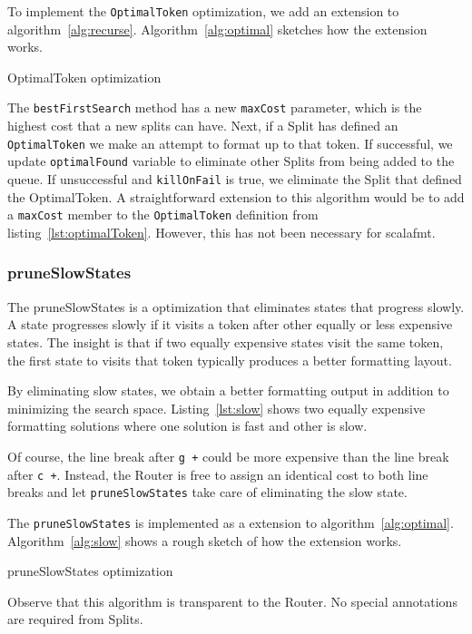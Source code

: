 To implement the \texttt{OptimalToken} optimization, we add an extension to algorithm~\ref{alg:recurse}.
Algorithm~\ref{alg:optimal} sketches how the extension works.
\begin{algorithm}
  \caption{OptimalToken optimization}\label{alg:optimal}
  
\end{algorithm}
The \texttt{bestFirstSearch} method has a new \texttt{maxCost} parameter, which is the highest cost that a new splits can have.
Next, if a Split has defined an \texttt{OptimalToken} we make an attempt to format up to that token.
If successful, we update \texttt{optimalFound} variable to eliminate other Splits from being added to the queue.
If unsuccessful and \texttt{killOnFail} is true, we eliminate the Split that defined the OptimalToken.
A straightforward extension to this algorithm would be to add a \texttt{maxCost} member to the \texttt{OptimalToken} definition from listing~\ref{lst:optimalToken}.
However, this has not been necessary for scalafmt.

\subsubsection{pruneSlowStates}
The pruneSlowStates is a optimization that eliminates states that progress slowly.
A state progresses slowly if it visits a token after other equally or less expensive states.
The insight is that if two equally expensive states visit the same token, the first state to visits that token typically produces a better formatting layout.

By eliminating slow states, we obtain a better formatting output in addition to minimizing the search space.
Listing~\ref{lst:slow} shows two equally expensive formatting solutions where one solution is fast and other is slow.

Of course, the line break after \texttt{g +} could be more expensive than the line break after \texttt{c +}.
Instead, the Router is free to assign an identical cost to both line breaks and let \texttt{pruneSlowStates} take care of eliminating the slow state.

The \texttt{pruneSlowStates} is implemented as a extension to algorithm~\ref{alg:optimal}.
Algorithm~\ref{alg:slow} shows a rough sketch of how the extension works.
\begin{algorithm}[H]
  \caption{pruneSlowStates optimization}\label{alg:slow}
  
\end{algorithm}
Observe that this algorithm is transparent to the Router.
No special annotations are required from Splits.

